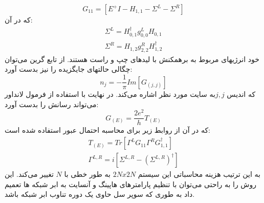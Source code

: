 \begin{equation}
    G_{11} = \left[E^+I- H_{1,1}- \Sigma^L-\Sigma^R\right]
\end{equation}
که در آن: 
\begin{equation}
    \begin{split}
        \Sigma^L = H^{\dagger}_{0,1} g^{L}_{0,0}H_{0,1}\\
        \Sigma^R = H_{1,2} g^{R}_{2,2}H^{\dagger}_{1,2}
    \end{split}
\end{equation}
خود انرژیهای مربوط به برهمکنش با لیدهای چپ و راست هستند. از تابع گرین می‌توان چگالی حالتهای جایگزیده  را نیز بدست آورد: 
\begin{equation}
    n_j = - \frac{1}{\pi} Im[G_{(j,j)}]
\end{equation}
که اندیس $j,j $به سایت مورد نظر اشاره می‌کند. در نهایت با استفاده از فرمول لانداور می‌تواند رسانش را بدست آورد:
\begin{equation}
    G_{(E)} = \frac{2e^2}{h} T_{(E)}
\end{equation}
که در آن از روابط زیر برای محاسبه احتمال عبور استفاده شده است: 
\begin{equation}
    \begin{split}
        T_{(E)} = Tr[\Gamma^{L}G_{11}\Gamma^{R}G^{\dagger}_{1,1}]\\
        \Gamma^{L,R} = i [\Sigma^{L,R}- (\Sigma^{L,R})^{\dagger}]
    \end{split}
\end{equation}
به این ترتیب هزینه محاسباتی این سیستم  $2N x 2N$ به طور خطی با $N$ تغییر می‌کند. این روش را به راحتی می‌توان با تنظیم پارامترهای هاپینگ و آنسایت به ابر شبکه ها تعمیم داد به طوری که سوپر سل حاوی یک دوره تناوب ابر شبکه باشد.